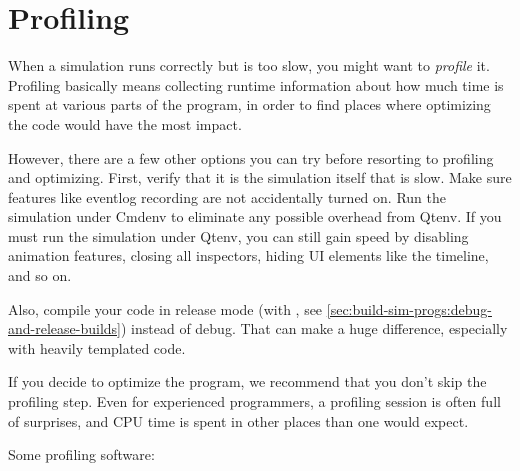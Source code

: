 \section{Profiling}
\label{sec:run-sim:profiling}

When a simulation runs correctly but is too slow, you might want to
\textit{profile} it. Profiling basically means collecting runtime
information about how much time is spent at various parts of the
program, in order to find places where optimizing the code would
have the most impact.

However, there are a few other options you can try before resorting to profiling
and optimizing. First, verify that it is the simulation itself that is slow.
Make sure features like eventlog recording are not accidentally turned on. Run
the simulation under Cmdenv to eliminate any possible overhead from Qtenv.
If you must run the simulation under Qtenv, you can still gain speed by
disabling animation features, closing all inspectors, hiding UI elements like
the timeline, and so on.

Also, compile your code in release mode (with , see
\ref{sec:build-sim-progs:debug-and-release-builds}) instead of debug. That
can make a huge difference, especially with heavily templated code.

\begin{hint}
If you decide to optimize the program, we recommend that you don't skip the
profiling step. Even for experienced programmers, a profiling session is often
full of surprises, and CPU time is spent in other places than one would
expect.
\end{hint}

Some profiling software:

